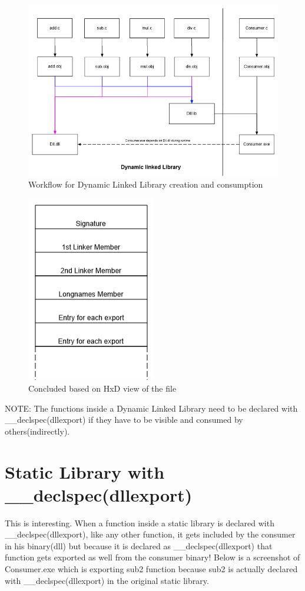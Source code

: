 \documentclass{article}
\begin{document}
\begin{figure}[H]
\centering
\includegraphics[width=\textwidth]{3.Dll.png}
\caption{Workflow for Dynamic Linked Library creation and consumption}
\end{figure}
\begin{figure}[H]
\centering
\includegraphics{4.StructureDll.png}
\caption{Concluded based on HxD view of the file}
\end{figure}

NOTE: The functions inside a Dynamic Linked Library need to be declared
with \_\_declspec(dllexport) if they have to be visible and consumed
by others(indirectly).


\section{Static Library with \_\_declspec(dllexport)}
This is interesting. When a function inside a static library is declared
with \_\_declspec(dllexport), like any other function, it gets included
by the consumer in his binary(dll) but because it is declared as
\_\_declspec(dllexport) that function gets exported as well from the consumer
binary! Below is a screenshot of Consumer.exe which is exporting sub2 function
because sub2 is actually declared with \_\_declspec(dllexport) in the
original static library.
\end{document}
